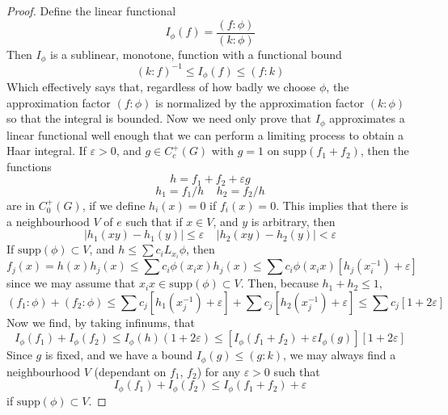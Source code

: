 \begin{proof}
    Define the linear functional
    \[ I_\phi(f) = \frac{(f: \phi)}{(k: \phi)} \]
    Then $I_\phi$ is a sublinear, monotone, function with a functional bound
    \[ (k: f)^{-1} \leq I_\phi(f) \leq (f: k) \]
    Which effectively says that, regardless of how badly we choose $\phi$, the approximation factor $(f:\phi)$ is normalized by the approximation factor $(k:\phi)$ so that the integral is bounded. Now we need only prove that $I_\phi$ approximates a linear functional well enough that we can perform a limiting process to obtain a Haar integral. If $\varepsilon > 0$, and $g \in C_c^+(G)$ with $g = 1$ on $\text{supp}(f_1 + f_2)$, then the functions
    \[ h = f_1 + f_2 + \varepsilon g \]
    \[ h_1 = f_1/h \ \ \ \ \ h_2 = f_2/h \]
    are in $C^+_0(G)$, if we define $h_i(x) = 0$ if $f_i(x) = 0$. This implies that there is a neighbourhood $V$ of $e$ such that if $x \in V$, and $y$ is arbitrary, then
    \[ | h_1(xy) - h_1(y) | \leq \varepsilon\ \ \ \ \ | h_2(xy) - h_2(y) | < \varepsilon \]
    If $\text{supp}(\phi) \subset V$, and $h \leq \sum c_i L_{x_i} \phi$, then
    \[ f_j(x) = h(x) h_j(x) \leq \sum c_i \phi(x_i x) h_j(x) \leq \sum c_i \phi(x_i x) \left[ h_j(x_i^{-1}) + \varepsilon \right] \]
    since we may assume that $x_i x \in \text{supp}(\phi) \subset V$. Then, because $h_1 + h_2 \leq 1$,
    \[ (f_1: \phi) + (f_2 : \phi) \leq \sum c_j [h_1(x_j^{-1}) + \varepsilon] + \sum c_j [h_2(x_j^{-1}) + \varepsilon] \leq \sum c_j [1 + 2 \varepsilon] \]
    Now we find, by taking infinums, that
    \[ I_\phi(f_1) + I_\phi(f_2) \leq I_\phi(h) (1 + 2 \varepsilon) \leq [I_\phi(f_1 + f_2) + \varepsilon I_\phi(g)] [1 + 2 \varepsilon] \]
    Since $g$ is fixed, and we have a bound $I_\phi(g) \leq (g: k)$, we may always find a neighbourhood $V$ (dependant on $f_1$, $f_2$) for any $\varepsilon > 0$ such that
    \[ I_\phi(f_1) + I_\phi(f_2) \leq I_\phi(f_1 + f_2) + \varepsilon \]
    if $\text{supp}(\phi) \subset V$.


\end{proof}
